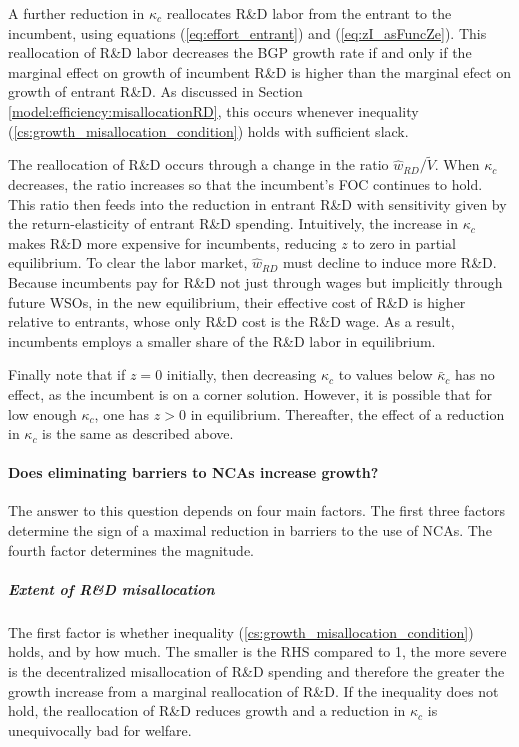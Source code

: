 \documentclass[11pt,english]{article}
\begin{document}
A further reduction in $\kappa_c$ reallocates R\&D labor from the entrant to the incumbent, using equations (\ref{eq:effort_entrant}) and (\ref{eq:zI_asFuncZe}). This reallocation of R\&D labor decreases the BGP growth rate if and only if the marginal effect on growth of incumbent R\&D is higher than the marginal efect on growth of entrant R\&D. As discussed in Section \ref{model:efficiency:misallocationRD}, this occurs whenever inequality (\ref{cs:growth_misallocation_condition}) holds with sufficient slack. 

The reallocation of R\&D occurs through a change in the ratio $\hat{w}_{RD} / \tilde{V}$. When $\kappa_c$ decreases, the ratio increases so that the incumbent's FOC continues to hold. This ratio then feeds into the reduction in entrant R\&D with sensitivity given by the return-elasticity of entrant R\&D spending. Intuitively, the increase in $\kappa_c$ makes R\&D more expensive for incumbents, reducing $z$ to zero in partial equilibrium. To clear the labor market, $\hat{w}_{RD}$ must decline to induce more R\&D. Because incumbents pay for R\&D not just through wages but implicitly through future WSOs, in the new equilibrium, their effective cost of R\&D is higher relative to entrants, whose only R\&D cost is the R\&D wage. As a result, incumbents employs a smaller share of the R\&D labor in equilibrium.

Finally note that if $z = 0$ initially, then decreasing $\kappa_{c}$ to values below $\bar{\kappa}_c$ has no effect, as the incumbent is on a corner solution. However, it is possible that for low enough $\kappa_c$, one has $z > 0$ in equilibrium. Thereafter, the effect of a reduction in $\kappa_c$ is the same as described above.

\paragraph{Does eliminating barriers to NCAs increase growth?}

The answer to this question depends on four main factors. The first three factors determine the sign of a maximal reduction in barriers to the use of NCAs. The fourth factor determines the magnitude.

\subparagraph{Extent of R\&D misallocation} The first factor is whether inequality (\ref{cs:growth_misallocation_condition}) holds, and by how much. The smaller is the RHS compared to 1, the more severe is the decentralized misallocation of R\&D spending and therefore the greater the growth increase from a marginal reallocation of R\&D. If the inequality does not hold, the reallocation of R\&D reduces growth and a reduction in $\kappa_c$ is unequivocally bad for welfare. 
\end{document}
